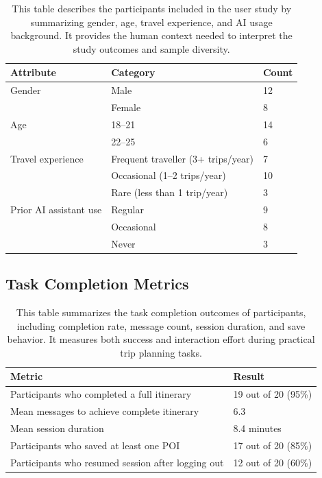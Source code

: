 \documentclass[12pt,a4paper]{report}
\newcommand{\tableexpl}[1]{\caption*{\small #1}}
\begin{document}
\begin{table}[H]
\centering
\caption{User Study Participant Demographics (n=20)}
\tableexpl{This table describes the participants included in the user study by summarizing gender, age, travel experience, and AI usage background. It provides the human context needed to interpret the study outcomes and sample diversity.}
\label{tab:demographics}
\begin{tabular}{lll}
\toprule
\textbf{Attribute} & \textbf{Category} & \textbf{Count} \\
\midrule
Gender & Male & 12 \\
       & Female & 8 \\
\midrule
Age    & 18--21 & 14 \\
       & 22--25 & 6 \\
\midrule
Travel experience & Frequent traveller (3+ trips/year) & 7 \\
                  & Occasional (1--2 trips/year)        & 10 \\
                  & Rare (less than 1 trip/year)         & 3 \\
\midrule
Prior AI assistant use & Regular & 9 \\
                       & Occasional & 8 \\
                       & Never & 3 \\
\bottomrule
\end{tabular}
\end{table}

\subsection{Task Completion Metrics}

\begin{table}[H]
\centering
\caption{Task Completion Metrics}
\tableexpl{This table summarizes the task completion outcomes of participants, including completion rate, message count, session duration, and save behavior. It measures both success and interaction effort during practical trip planning tasks.}
\label{tab:task_completion}
\begin{tabular}{ll}
\toprule
\textbf{Metric} & \textbf{Result} \\
\midrule
Participants who completed a full itinerary  & 19 out of 20 (95\%) \\
Mean messages to achieve complete itinerary  & 6.3 \\
Mean session duration                        & 8.4 minutes \\
Participants who saved at least one POI      & 17 out of 20 (85\%) \\
Participants who resumed session after logging out & 12 out of 20 (60\%) \\
\bottomrule
\end{tabular}
\end{table}
\end{document}
